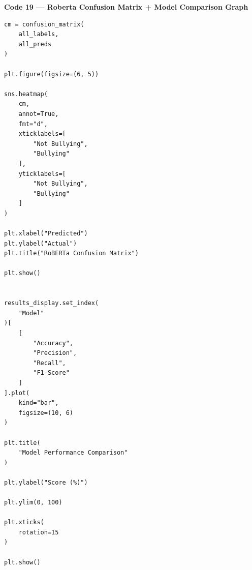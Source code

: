 \documentclass[11pt,a4paper]{article}
\begin{document}
\noindent\textbf{Code 19 --- Roberta Confusion Matrix + Model Comparison Graph}
\begin{lstlisting}
cm = confusion_matrix(
    all_labels,
    all_preds
)

plt.figure(figsize=(6, 5))

sns.heatmap(
    cm,
    annot=True,
    fmt="d",
    xticklabels=[
        "Not Bullying",
        "Bullying"
    ],
    yticklabels=[
        "Not Bullying",
        "Bullying"
    ]
)

plt.xlabel("Predicted")
plt.ylabel("Actual")
plt.title("RoBERTa Confusion Matrix")

plt.show()


results_display.set_index(
    "Model"
)[
    [
        "Accuracy",
        "Precision",
        "Recall",
        "F1-Score"
    ]
].plot(
    kind="bar",
    figsize=(10, 6)
)

plt.title(
    "Model Performance Comparison"
)

plt.ylabel("Score (%)")

plt.ylim(0, 100)

plt.xticks(
    rotation=15
)

plt.show()
\end{lstlisting}
\end{document}
